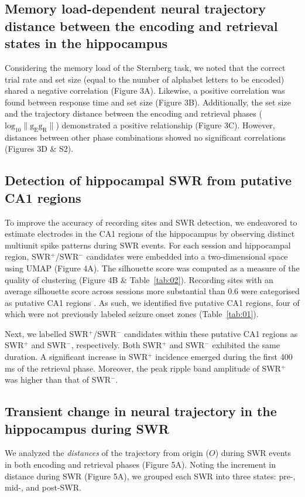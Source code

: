\documentclass[final,3p,times,twocolumn]{elsarticle}
\begin{document}
\subsection{Memory load-dependent neural trajectory distance between the encoding and retrieval states in the hippocampus}
Considering the memory load of the Sternberg task, we noted that the correct trial rate and set size (equal to the number of alphabet letters to be encoded) shared a negative correlation (Figure 3A). Likewise, a positive correlation was found between response time and set size (Figure 3B). Additionally, the set size and the trajectory distance between the encoding and retrieval phases ($\mathrm{log_{10}\lVert g_{E}g_{R} \rVert}$) demonstrated a positive relationship (Figure 3C). However, distances between other phase combinations showed no significant correlations (Figures 3D \& S2).

\subsection{Detection of hippocampal SWR from putative CA1 regions}
To improve the accuracy of recording sites and SWR detection, we endeavored to estimate electrodes in the CA1 regions of the hippocampus by observing distinct multiunit spike patterns during SWR events. For each session and hippocampal region, SWR$^+$/SWR$^-$ candidates were embedded into a two-dimensional space using UMAP (Figure 4A). The silhouette score was computed as a measure of the quality of clustering (Figure 4B \& Table~\ref{tab:02}). Recording sites with an average silhouette score across sessions more substantial than 0.6 were categorised as putative CA1 regions \cite{mcinnes_umap_2018, rousseeuw_silhouettes_1987}. As such, we identified five putative CA1 regions, four of which were not previously labeled seizure onset zones (Table~\ref{tab:01}).

Next, we labelled SWR$^+$/SWR$^-$ candidates within these putative CA1 regions as SWR$^+$ and SWR$^-$, respectively. Both SWR$^+$ and SWR$^-$ exhibited the same duration. A significant increase in SWR$^+$ incidence emerged during the first 400 ms of the retrieval phase. Moreover, the peak ripple band amplitude of SWR$^+$ was higher than that of SWR$^-$.

\subsection{Transient change in neural trajectory in the hippocampus during SWR}
We analyzed the \textit{distances} of the trajectory from origin ($O$) during SWR events in both encoding and retrieval phases (Figure 5A). Noting the increment in distance during SWR (Figure 5A), we grouped each SWR into three states: pre-, mid-, and post-SWR. 
\end{document}
